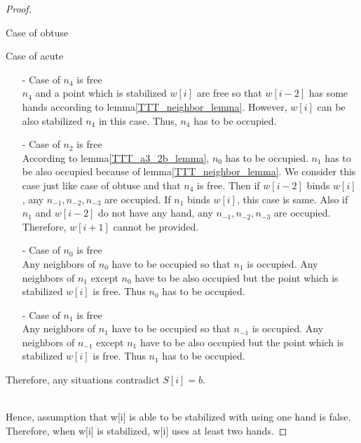 \begin{proof}
\begin{paragraph}{Case of obtuse}
\end{paragraph}



\begin{paragraph}{Case of acute}
\begin{itemize}
\item[-] Case of $n_4$ is free\\
$n_4$ and a point which is stabilized $w[i]$ are free so that  $w[i-2]$ has some hands according to lemma\ref{TTT_neighbor_lemma}.
However, $w[i]$ can be also stabilized $n_4$ in this case. Thus, $n_4$ has to be occupied.
\item[-] Case of $n_2$ is free\\
According to lemma\ref{TTT_a3_2b_lemma}, $n_0$ has to be occupied. $n_1$ has to be also occupied because of lemma\ref{TTT_neighbor_lemma}.
We consider this case just like case of obtuse and that $n_4$ is free. Then if $w[i-2]$ binds $w[i]$, any $n_{-1}, n_{-2}, n_{-3}$ are occupied. If $n_1$ binds $w[i]$, this case is same. Also if $n_1$ and $w[i-2]$ do not have any hand, any $n_{-1}, n_{-2}, n_{-3}$ are occupied. Therefore, $w[i+1]$ cannot be provided.
\item[-] Case of $n_0$ is free\\
Any neighbors of $n_0$ have to be occupied so that $n_{1}$ is occupied. Any neighbors of $n_{1}$ except $n_0$ have to be also occupied but the point which is stabilized $w[i]$ is free. Thus $n_0$ has to be occupied. 
\item[-] Case of $n_1$ is free\\
Any neighbors of $n_1$ have to be occupied so that $n_{-1}$ is occupied. Any neighbors of $n_{-1}$ except $n_1$ have to be also occupied but the point which is stabilized $w[i]$ is free. Thus $n_1$ has to be occupied. 
\end{itemize}

Therefore, any situations contradict $S[i] = b$.
\end{paragraph}\\


Hence, assumption that w[i] is able to be stabilized with using one hand is false.
Therefore, when w[i] is stabilized, w[i] uses at least two hands.
\end{proof}

